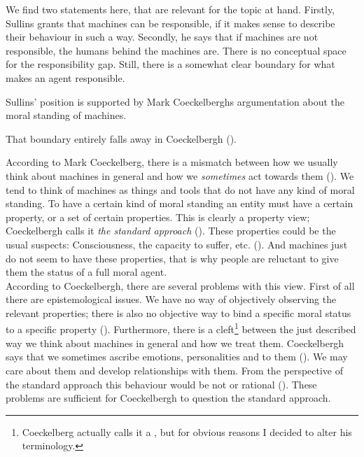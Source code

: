 \documentclass{article}
\begin{document}
We find two statements here, that are relevant for the topic at hand. Firstly,
Sullins grants that machines can be responsible, if it makes sense to describe
their behaviour in such a way. Secondly, he says that if
machines are not responsible, the humans behind the machines are. There is no
conceptual space for the responsibility gap. Still, there is a somewhat clear
boundary for what makes an agent responsible.


Sullins' position is supported by Mark Coeckelberghs argumentation about the
moral standing of machines.

That boundary entirely falls away in Coeckelbergh (\cite{coeckelbergh2014moral}).

According to Mark Coeckelberg, there is a mismatch between how we usually think
about machines in general and how we \textit{sometimes} act towards them
(\cite[p. 61]{coeckelbergh2014moral}). We tend to think of machines as
things and tools that do not have any kind of moral standing. To have a certain
kind of moral standing an entity must have a certain property, or a set of
certain properties. This is clearly a property view; Coeckelbergh calls it \textit{the
standard approach} (\cite[p. 62]{coeckelbergh2014moral}). These properties could be the
usual suspects: Consciousness, the capacity to suffer, etc. (\cite[p.
62-63]{coeckelbergh2014moral}). And machines just do not seem to have these
properties, that is why people are reluctant to give them the status of a full
moral agent.\\
According to Coeckelbergh, there are several problems with this
view. First of all there are epistemological issues. We have no way of
objectively observing the relevant properties; there is also no objective way to
bind a specific moral status to a specific property
(\cite[p. 63]{coeckelbergh2014moral}). Furthermore, there is a
cleft\footnote{Coeckelberg actually calls it a , but for obvious reasons I
decided to alter his terminology.} between the just described way we think about
machines in general and how we treat them. Coeckelbergh says that we
sometimes ascribe emotions, personalities and  to them (\cite[p.
62, 64]{coeckelbergh2014moral}). We may care about them and develop
relationships with them. From the perspective of the standard approach this
behaviour would be not  or rational (\cite[p.
64]{coeckelbergh2014moral}). These problems are sufficient for Coeckelbergh to
question the standard approach.\\
\end{document}
